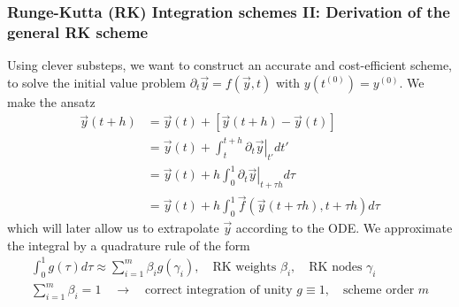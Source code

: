 \subsubsection{Runge-Kutta (RK) Integration schemes II: Derivation of the general RK scheme}
Using clever substeps, we want to construct an accurate and cost-efficient scheme, to solve the initial
value problem $\partial_t \vec{y} = f(\vec{y},t)$ with $y(t^{(0)}) = y^{(0)}$. We make the ansatz
\begin{equation}
  \label{eq:rk_ansatz}
  \begin{aligned}
  \vec{y}(t+h) &= \vec{y}(t) + \left[\vec{y}(t+h) - \vec{y}(t)\right] \\
               &= \vec{y}(t) + \int_{t}^{t+h} \left. \partial_t \vec{y} \right|_{t'} dt' \\
               &= \vec{y}(t) + h \int_{0}^{1} \left. \partial_t \vec{y} \right|_{t + \tau h} d\tau \\
               &= \vec{y}(t) + h \int_{0}^{1} \vec{f}(\vec{y}(t + \tau h), t + \tau h) d\tau
  \end{aligned}
\end{equation}
which will later allow us to extrapolate $\vec{y}$ according to the ODE. We approximate the integral
by a quadrature rule of the form
\begin{equation}
  \begin{gathered}
  \int_{0}^{1} g(\tau) d\tau \approx \sum_{i=1}^{m} \beta_i g(\gamma_i), \quad \text{RK weights } \beta_i, \quad \text{RK nodes } \gamma_i \\
  \sum_{i=1}^{m} \beta_i = 1 \quad \rightarrow \quad \text{correct integration of unity } g \equiv 1, \quad \text{scheme order } m
  \end{gathered}
\end{equation}

